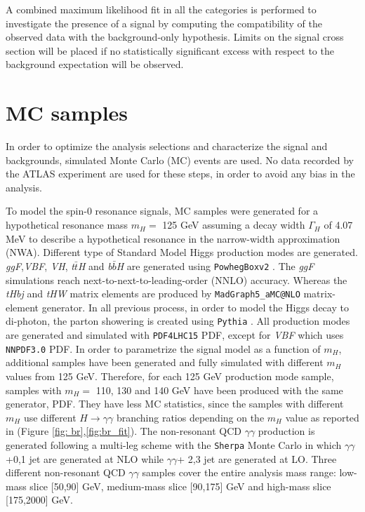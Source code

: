 \documentclass[a4paper, oneside, 11pt, openright]{book}
\begin{document}
 		A combined maximum likelihood fit in all the categories is performed to investigate the presence of a signal by computing the compatibility of the observed data with the background-only hypothesis. Limits on the signal cross section will be placed if no statistically significant excess with respect to the background expectation will be observed.
 		
 	
 		\section{MC samples}
			In order to optimize the analysis selections and characterize the signal and backgrounds, simulated Monte Carlo (MC) events are used. No data recorded by the ATLAS experiment are used for these steps, in order to avoid any bias in the analysis. 
			
			To model the spin-0 resonance signals, MC samples were generated for a hypothetical resonance mass $m_H =$ 125 GeV assuming a decay width $\Gamma_H$ of 4.07 MeV to describe a hypothetical resonance in the narrow-width approximation (NWA). Different type of Standard Model Higgs production modes are generated. \textit{ggF},\textit{VBF}, \textit{VH}, \textit{t$\bar{t}$H} and \textit{b$\bar{b}$H} are generated using \texttt{PowhegBoxv2} \cite{Pow_1,Pow_2,Pow_3,Pow_4}. The \textit{ggF} simulations reach next-to-next-to-leading-order (NNLO) accuracy. Whereas the \textit{tHbj} and \textit{tHW} matrix elements are produced by \texttt{MadGraph5\_aMC@NLO} matrix-element generator. In all previous process, in order to model the Higgs decay to di-photon, the parton showering is created using \texttt{Pythia} \cite{Pythia}. All production modes are generated and simulated with \texttt{PDF4LHC15} PDF, except for \textit{VBF} which uses \texttt{NNPDF3.0} PDF. In order to parametrize the signal model as a function of $m_H$, additional samples have been generated and fully simulated with different $m_H$ values from 125 GeV. Therefore, for each 125 GeV production mode sample, samples with $m_H =$ 110, 130 and 140 GeV have been produced with the same generator, PDF. They have less MC statistics, since the samples with different $m_H$ use different $H\to\gamma\gamma$ branching ratios depending on the $m_H$ value as reported in \cite{yellow4} (Figure \ref{fig: br},\ref{fig:br_fit}). The non-resonant QCD $\gamma\gamma$ production is generated following a multi-leg scheme with the \texttt{Sherpa} Monte Carlo in which $\gamma\gamma$+0,1 jet are generated at NLO while $\gamma\gamma$+ 2,3 jet are generated at LO. Three different non-resonant QCD $\gamma\gamma$ samples cover the entire analysis mass range: low-mass slice [50,90] GeV, medium-mass slice [90,175] GeV and high-mass slice [175,2000] GeV.
			
\end{document}
